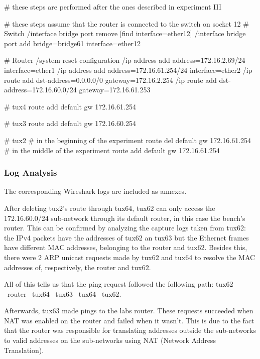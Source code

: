 \begin{code-bash}
# these steps are performed after the ones described in experiment III

# these steps assume that the router is connected to the switch on socket 12
# Switch
/interface bridge port remove [find interface=ether12]
/interface bridge port add bridge=bridge61 interface=ether12

# Router
/system reset-configuration
/ip address add address=172.16.2.69/24 interface=ether1
/ip address add address=172.16.61.254/24 interface=ether2
/ip route add dst-address=0.0.0.0/0 gateway=172.16.2.254
/ip route add dst-address=172.16.60.0/24 gateway=172.16.61.253

# tux4
route add default gw 172.16.61.254

# tux3
route add default gw 172.16.60.254

# tux2
# in the beginning of the experiment
route del default gw 172.16.61.254
# in the middle of the experiment
route add default gw 172.16.61.254

\end{code-bash}

\subsubsection{Log Analysis}

The corresponding Wireshark logs are included as annexes.

After deleting tux2's route through tux64, tux62 can only access the 172.16.60.0/24 sub-network through its default router, in this case the bench's router.
This can be confirmed by analyzing the capture logs taken from tux62: the IPv4 packets have the addresses of tux62 an tux63 but the Ethernet frames have different MAC addresses, belonging to the router and tux62.
Besides this, there were 2 ARP unicast requests made by tux62 and tux64 to resolve the MAC addresses of, respectively, the router and tux62.

All of this tells us that the ping request followed the following path: tux62 \textrightarrow\ router \textrightarrow\ tux64 \textrightarrow\ tux63 \textrightarrow\ tux64 \textrightarrow\ tux62.

Afterwards, tux63 made pings to the labs router. These requests succeeded when NAT was enabled on the router and failed when it wasn't. This is due to the fact that the router was responsible for translating addresses outside the sub-networks to valid addresses on the sub-networks using NAT (Network Address Translation).

